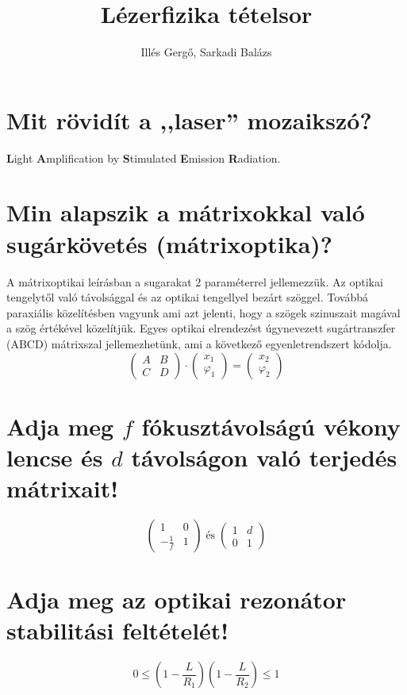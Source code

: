 \documentclass[12pt, a4paper]{article}
\title{\bfseries Lézerfizika tételsor}
\author{Illés Gergő, Sarkadi Balázs}
\begin{document}
\maketitle

\section{Mit rövidít a ,,laser'' mozaikszó?}
\textbf Light \textbf Amplification by \textbf Stimulated \textbf Emission \textbf Radiation.

\section{Min alapszik a mátrixokkal való sugárkövetés (mátrixoptika)?}
A mátrixoptikai leírásban a sugarakat 2 paraméterrel jellemezzük. Az optikai tengelytől való távolsággal és az optikai tengellyel bezárt szöggel. Továbbá paraxiális közelítésben vagyunk ami azt jelenti, hogy a szögek szinuszait magával a szög értékével közelítjük. Egyes optikai elrendezést úgynevezett sugártranszfer (ABCD) mátrixszal jellemezhetünk, ami a következő egyenletrendszert kódolja.
\begin{equation}
\begin{pmatrix}
A&B\\C&D
\end{pmatrix}\cdot
\begin{pmatrix}
x_1\\\varphi_1
\end{pmatrix}=\begin{pmatrix}
x_2\\\varphi_2
\end{pmatrix}
\end{equation}

\section{Adja meg $f$ fókusztávolságú vékony lencse és $d$ távolságon való terjedés mátrixait!}
\begin{equation}
\begin{pmatrix}
1&0\\-\frac{1}{f}&1
\end{pmatrix}\;\text{és}\;
\begin{pmatrix}
1&d\\0&1
\end{pmatrix}
\end{equation}
\section{Adja meg az optikai rezonátor stabilitási feltételét!}
\begin{equation}
0\leq\left(1-\frac{L}{R_1}\right)\left(1-\frac{L}{R_2}\right)\leq 1
\end{equation}
\end{document}
